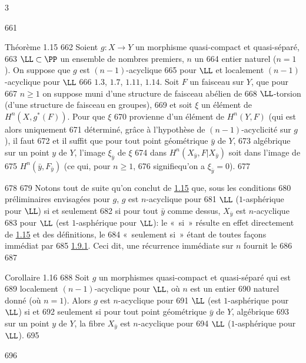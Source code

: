 3	\documentclass[10pt]{../fichiers-configuration-latex/smfart}
\begin{document}
   661	\begin{enonce*}{Théorème 1.15}
   662	Soient $g:X\rightarrow Y$ un morphisme quasi-compact et quasi-séparé,
   663	$\LL\subset \PP$ un ensemble de nombres premiers, $n$ un
   664	entier naturel (\resp $n=1$). On suppose que $g$ est $(n-1)$-acyclique
   665	pour $\LL$ et localement $(n-1)$-acyclique pour $\LL$
   666	$1.3$, $1.7$, $1.11$, $1.14$. Soit $F$ un faisceau sur $Y$, que pour
   667	$n\geq 1$ on suppose muni d'une structure de faisceau abélien de
   668	$\LL$-torsion (\resp d'une structure de faisceau en groupes),
   669	et soit $\xi$ un élément de $H^{n}(X,g^{\ast}(F))$. Pour que $\xi$
   670	provienne d'un élément de $H^{n}(Y,F)$ (qui est alors uniquement
   671	déterminé, grâce à l'hypothèse de $(n-1)$-acyclicité sur $g$), il faut
   672	et il suffit que pour tout point géométrique $\bar{y}$ de $Y$,
   673	algébrique sur un point $y$ de $Y$, l'image $\xi_{\bar{y}}$ de $\xi$
   674	dans $H^{n}(X_{\bar{y}},F|X_{\bar{y}})$ soit dans l'image de
   675	$H^{n}(\bar{y},F_{\bar{y}})$ (ce qui, pour $n\geq 1$,
   676	signifie\pageoriginale qu'on a $\xi_{\bar{y}}=0$).
   677	\end{enonce*}
   678	
   679	Notons tout de suite qu'on conclut de \hyperref[XV.thm1.15]{1.15} que, sous les conditions
   680	préliminaires envisagées pour $g$, $g$ est $n$-acyclique pour
   681	$\LL$ (\resp $1$-asphérique pour $\LL$) si et seulement
   682	si pour tout $\bar{y}$ comme dessus, $X_{\bar{y}}$ est $n$-acyclique
   683	pour $\LL$ (\resp est $1$-asphérique pour $\LL$): le « si »  résulte en effet directement de \hyperref[XV.thm1.15]{1.15} et des définitions, le
   684	« seulement si »  étant de toutes façons immédiat par
   685	\hyperref[XV.cor1.9.1]{1.9.1}. Ceci dit, une récurrence immédiate sur $n$ fournit le
   686	
   687	\begin{enonce*}{Corollaire 1.16}
   688	Soit $g$ un morphismes quasi-compact et quasi-séparé qui est
   689	localement $(n-1)$-acyclique pour $\LL$, où $n$ est un entier
   690	naturel donné (\resp où $n=1$). Alors $g$ est $n$-acyclique pour
   691	$\LL$ (\resp est $1$-asphérique pour $\LL$) si et
   692	seulement si pour tout point géométrique $\bar{y}$ de $Y$, algébrique
   693	sur un point $y$ de $Y$, la fibre $X_{\bar{y}}$ est $n$-acyclique pour
   694	$\LL$ (\resp $1$-asphérique pour $\LL$).
   695	\end{enonce*}
   696	
\end{document}
